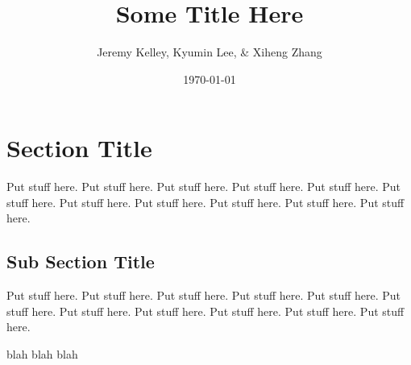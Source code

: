 \documentclass{article}
\begin{document}
\setlength{\parindent}{0pt}
\setlength{\parskip}{.5ex plus 0.5ex minus 0.2ex}




\title{ Some Title Here }

\author{ Jeremy Kelley, Kyumin Lee, \& Xiheng Zhang }

\date{\today}

\maketitle

\section{Section Title}

Put stuff here.  Put stuff here.  Put stuff here.  Put stuff here.  Put stuff
here.  Put stuff here.  Put stuff here.  Put stuff here.  Put stuff here.  Put
stuff here.  Put stuff here.  

\subsection{Sub Section Title}

Put stuff here.  Put stuff here.  Put stuff here.  Put stuff here.  Put stuff
here.  Put stuff here.  Put stuff here.  Put stuff here.  Put stuff here.  Put
stuff here.  Put stuff here.  \cite{weka}

blah blah blah


 
\end{document}
